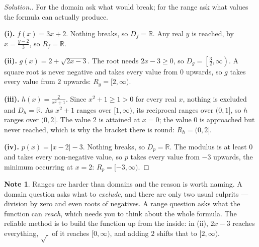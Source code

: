 \documentclass[11pt,a4paper]{article}
\theoremstyle{definition}
\newtheorem{note}[thm]{Note}
\newenvironment{solution}
  {\renewcommand{\qedsymbol}{}\begin{proof}[\textit{Solution}.]}
  {\end{proof}}
\begin{document}
\begin{solution}
For the domain ask what would break; for the range ask what values the formula can
actually produce.

\textbf{(i).} $f(x)=3x+2$. Nothing breaks, so $D_f=\mathbb{R}$. Any real $y$ is
reached, by $x=\frac{y-2}{3}$, so $R_f=\mathbb{R}$.

\textbf{(ii).} $g(x)=2+\sqrt{2x-3}$. The root needs $2x-3\geq 0$, so
$D_g=\left[\frac{3}{2},\infty\right)$. A square root is never negative and takes
every value from $0$ upwards, so $g$ takes every value from $2$ upwards:
$R_g=[2,\infty)$.

\textbf{(iii).} $h(x)=\frac{2}{x^{2}+1}$. Since $x^{2}+1\geq 1>0$ for every real
$x$, nothing is excluded and $D_h=\mathbb{R}$. As $x^{2}+1$ ranges over
$[1,\infty)$, its reciprocal ranges over $(0,1]$, so $h$ ranges over $(0,2]$. The
value $2$ is attained at $x=0$; the value $0$ is approached but never reached, which
is why the bracket there is round: $R_h=(0,2]$.

\textbf{(iv).} $p(x)=\left|x-2\right|-3$. Nothing breaks, so $D_p=\mathbb{R}$. The
modulus is at least $0$ and takes every non-negative value, so $p$ takes every
value from $-3$ upwards, the minimum occurring at $x=2$: $R_p=[-3,\infty)$.
\end{solution}

\begin{note}
Ranges are harder than domains and the reason is worth naming. A domain question
asks what to \emph{exclude}, and there are only two usual culprits --- division by
zero and even roots of negatives. A range question asks what the function can
\emph{reach}, which needs you to think about the whole formula. The reliable method
is to build the function up from the inside: in (ii), $2x-3$ reaches everything,
$\sqrt{\ }$ of it reaches $[0,\infty)$, and adding $2$ shifts that to
$[2,\infty)$.
\end{note}
\end{document}
